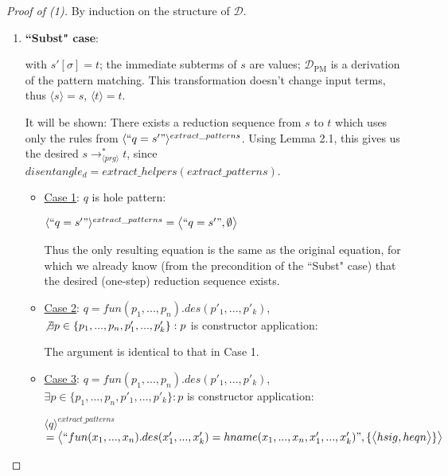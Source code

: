 \documentclass[11pt]{article} %
\begin{document}
\begin{proof}[Proof of (1)] By induction on the structure of $\mathcal{D}$.

\begin{enumerate}

\item \textbf{``Subst" case}:

\begin{prooftree}
\end{prooftree}

with $s'[\sigma] = t$; the immediate subterms of $s$ are values; $\mathcal{D}_{\textrm{PM}}$ is a derivation of the pattern matching. This transformation doesn't change input terms, thus $\langle s \rangle = s$, $\langle t \rangle = t$.

It will be shown: There exists a reduction sequence from $s$ to $t$ which uses only the rules from $\langle `` q = s' " \rangle^{extract\_patterns}$. Using Lemma 2.1, this gives us the desired $s \longrightarrow_{\langle prg \rangle}^* t$, since $disentangle_d = extract\_helpers(extract\_patterns)$.

\begin{itemize}

\item \underline{Case 1}: $q$ is hole pattern:

$\langle `` q = s' " \rangle^{extract\_patterns} = \big\langle `` q = s' ", \emptyset \big\rangle$

Thus the only resulting equation is the same as the original equation, for which we already know (from the precondition of the ``Subst" case) that the desired (one-step) reduction sequence exists.

\item \underline{Case 2}: $q = fun(p_1, ..., p_n).des(p'_1, ..., p'_k)$, $\not\exists p \in \{ p_1, ..., p_n, p'_1, ..., p'_k \}: p$ is constructor application:

The argument is identical to that in Case 1.

\item \underline{Case 3}: $q = fun(p_1, ..., p_n).des(p'_1, ..., p'_k)$, $\exists p \in \{ p_1, ..., p_n, p'_1, ..., p'_k \}: p$ is constructor application:

$\langle q \rangle^{extract\_patterns}$\\
$= \big\langle `` fun(x_1, ..., x_n).des(x'_1, ..., x'_k) = hname(x_1, ..., x_n, x'_1, ..., x'_k) ", \{ \big\langle hsig, heqn \big\rangle \} \big\rangle $


\end{itemize}
\end{enumerate}
\end{proof}
\end{document}
